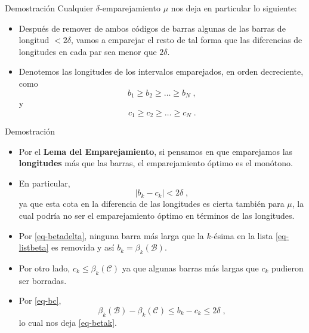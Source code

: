 \documentclass{beamer}
\newcommand{\calB}{{\mathcal{B}}}
\newcommand{\calC}{{\mathcal{C}}}
\begin{document}
\begin{frame}{Demostración}
Cualquier $\delta$-emparejamiento $\mu$ nos deja en particular lo siguiente:
\pause
\begin{itemize}
    \item Después de remover de ambos códigos de barras algunas de las barras de longitud $< 2\delta$, vamos a emparejar el resto de tal forma que las diferencias de longitudes en cada par sea menor que $2\delta$. \pause 
    \item Denotemos las longitudes de los intervalos emparejados, en orden decreciente, como 
	$$b_1 \geq b_2 \geq \dots \geq b_N \;,$$
	y
	$$c_1 \geq c_2 \geq \dots\geq c_N\;.$$
\end{itemize}

\end{frame}

\begin{frame}{Demostración} 
\begin{itemize}
    \item Por el  \textbf{{\color{cyan}Lema del Emparejamiento}}, si pensamos en que emparejamos las \textbf{{\color{green}longitudes}} más que las barras, el emparejamiento óptimo es el monótono. \pause
    \item En particular, 
	\begin{equation}\label{eq-bc}
	|b_k-c_k| < 2\delta\;,
	\end{equation}
	ya que esta cota en la diferencia de las longitudes es cierta también para $\mu$, la cual podría no ser el emparejamiento óptimo en términos de las longitudes.\pause
  \item Por \eqref{eq-betadelta}, ninguna barra más larga que la $k$-ésima en la lista \eqref{eq-listbeta} es removida y así $b_k = \beta_k(\calB)$. \pause 
  \item Por otro lado, $c_k \leq \beta_k(\calC)$ ya que algunas barras más largas que $c_k$ pudieron ser borradas.\pause
  \item  Por \eqref{eq-bc},
	$$\beta_k(\calB)-\beta_k(\calC) \leq b_k - c_k \leq 2\delta\;,$$
	lo cual nos deja \eqref{eq-betak}.
\end{itemize}
	
\end{frame}
\end{document}
